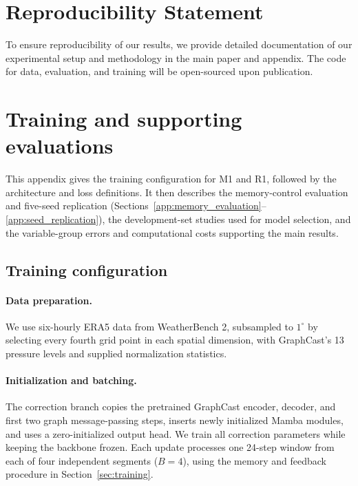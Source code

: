 \documentclass{article}
\newcommand{\suozhi}[1]{}
\renewcommand{\suozhi}[1]{}
\newcommand{\vfourchange}[1]{{\color{blue}#1}}
\begin{document}
\section*{Reproducibility Statement}
To ensure reproducibility of our results, we provide detailed documentation of our experimental setup and methodology in the main paper and appendix. The code for data, evaluation,
and training will be open-sourced upon publication.






\clearpage
\appendix

\section{\texorpdfstring{\vfourchange{Training and supporting evaluations}}{Training and supporting evaluations}}
\label{app:training}

\vfourchange{This appendix gives the training configuration for M1 and \vfourchange{R1}, followed by the architecture and loss definitions. It then describes the memory-control evaluation and five-seed replication (Sections~\ref{app:memory_evaluation}--\ref{app:seed_replication}), the development-set studies used for model selection, and the variable-group errors and computational costs supporting the main results.}

\subsection{Training configuration}
\label{app:training_configuration}

\paragraph{\vfourchange{Data preparation.}}
\vfourchange{We use six-hourly ERA5 data from WeatherBench 2, subsampled to $1^\circ$ by selecting every fourth grid point in each spatial dimension, with GraphCast's 13 pressure levels and supplied normalization statistics.}

\paragraph{\vfourchange{Initialization and batching.}}
\vfourchange{The correction branch copies the pretrained GraphCast encoder, decoder, and first two graph message-passing steps, inserts newly initialized Mamba modules, and uses a zero-initialized output head. We train all correction parameters while keeping the backbone frozen. Each update processes one 24-step window from each of four independent segments ($B=4$), using the memory and feedback procedure in Section~\ref{sec:training}.}
\end{document}
